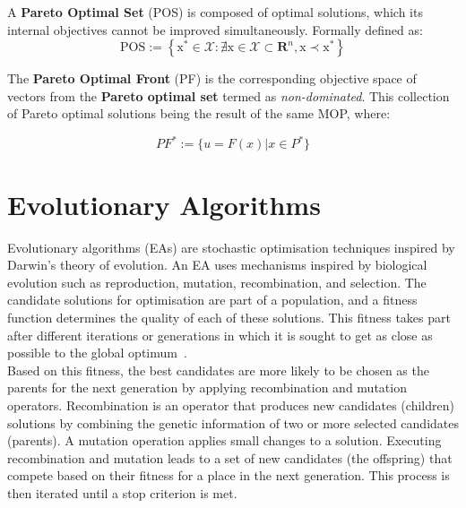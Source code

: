 \begin{definition}
    A \textbf{Pareto Optimal Set} (POS) is composed of optimal solutions, which its internal objectives cannot be improved simultaneously. Formally defined as:
    \begin{equation}
        \mathrm{POS}:=\left\{\mathrm{x}^{*} \in \mathcal{X}: \nexists \mathrm{x} \in \mathcal{X} \subset \mathbf{R}^{n}, \mathrm{x} \prec \mathrm{x}^{*}\right\}
    \end{equation}
\end{definition}  

\begin{definition}
    The \textbf{Pareto Optimal Front} (PF) is the corresponding objective space of vectors from the \textbf{Pareto optimal set} termed as \textit{non-dominated}. This collection of Pareto optimal solutions being the result of the same MOP, where: 
    
    \begin{equation}
        PF^* := \{u= F(x) | x \in P^*\}
    \end{equation}
\end{definition}

\section{Evolutionary Algorithms}

Evolutionary algorithms (EAs) are stochastic optimisation techniques inspired by Darwin's theory of evolution. An EA uses mechanisms inspired by biological evolution such as reproduction, mutation, recombination, and selection. The candidate solutions for optimisation are part of a population, and a fitness function determines the quality of each of these solutions. This fitness takes part after different iterations or generations in which it is sought to get as close as possible to the global optimum~\cite{eiben2003introduction}.\\

Based on this fitness, the best candidates are more likely to be chosen as the parents for the next generation by applying recombination and mutation operators. Recombination is an operator that produces new candidates (children) solutions by combining the genetic information of two or more selected candidates (parents). A mutation operation applies small changes to a solution. Executing recombination and mutation leads to a set of new candidates (the offspring) that compete based on their fitness for a place in the next generation. This process is then iterated until a stop criterion is met.\\

